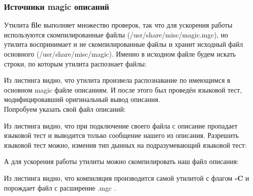 \documentclass[a4paper]{article}
\begin{document}
\subsubsection{Источники magic описаний}
Утилита \textbf{file} выполняет множество проверок, так что для ускорения работы используются скомпилированные файлы (/usr/share/misc/magic.mgc), но утилита воспринимает и не скомпилированные файлы и хранит исходный файл основного (/usr/share/misc/magic). Именно в исходном файле будем искать строки, по которым утилита распознает файлы:

Из листинга видно, что утилита произвела распознавание по имеющимся в основном magic файле описаниям. И после этого был проведён языковой тест, модифицировавший оригинальный вывод описания.\\

Попробуем указать свой файл описаний:

Из листинга видно, что при подключение своего файла с описание пропадает языковой тест и выводится только сообщение нашего из описания. Разрешить языковой тест можно, изменив тип дынных на подразумевающий языковой тест:

А для ускорения работы утилиты можно скомпилировать наш файл описания:

Из листинга видно, что компиляция производится самой утилитой с флагом \textbf{-C} и порождает файл с расширение .mgc .
\end{document}
